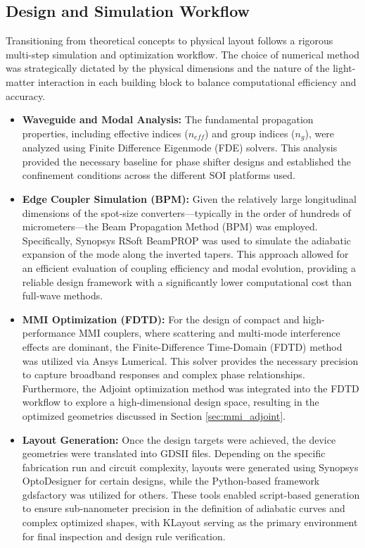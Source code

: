 \subsection{Design and Simulation Workflow} \label{subsec:workflow}

Transitioning from theoretical concepts to physical layout follows a rigorous multi-step simulation 
and optimization workflow. The choice of numerical method was strategically dictated by the 
physical dimensions and the nature of the light-matter interaction in each building block to 
balance computational efficiency and accuracy.

\begin{itemize}
    \item \textbf{Waveguide and Modal Analysis:} The fundamental propagation properties, including 
    effective indices ($n_{eff}$) and group indices ($n_g$), were analyzed using Finite Difference 
    Eigenmode (FDE) solvers. This analysis provided the necessary baseline for phase shifter 
    designs and established the confinement conditions across the different SOI platforms used.
    
    \item \textbf{Edge Coupler Simulation (BPM):} Given the relatively large longitudinal 
    dimensions of the spot-size converters---typically in the order of hundreds of 
    micrometers---the Beam Propagation Method (BPM) was employed. Specifically, Synopsys RSoft 
    BeamPROP was used to simulate the adiabatic expansion of the mode along the inverted tapers. 
    This approach allowed for an efficient evaluation of coupling efficiency and modal evolution, 
    providing a reliable design framework with a significantly lower computational cost than 
    full-wave methods.
    
    \item \textbf{MMI Optimization (FDTD):} For the design of compact and high-performance MMI 
    couplers, where scattering and multi-mode interference effects are dominant, the 
    Finite-Difference Time-Domain (FDTD) method was utilized via Ansys Lumerical. This solver 
    provides the necessary precision to capture broadband responses and complex phase 
    relationships. Furthermore, the Adjoint optimization method was integrated into the FDTD 
    workflow to explore a high-dimensional design space, resulting in the optimized geometries 
    discussed in Section \ref{sec:mmi_adjoint}.
    
    \item \textbf{Layout Generation:} Once the design targets were achieved, the device geometries 
    were translated into GDSII files. Depending on the specific fabrication run and circuit 
    complexity, layouts were generated using Synopsys OptoDesigner for certain designs, while the 
    Python-based framework gdsfactory was utilized for others. These tools enabled script-based 
    generation to ensure sub-nanometer precision in the definition of adiabatic curves and complex 
    optimized shapes, with KLayout serving as the primary environment for final inspection and 
    design rule verification.
\end{itemize}

